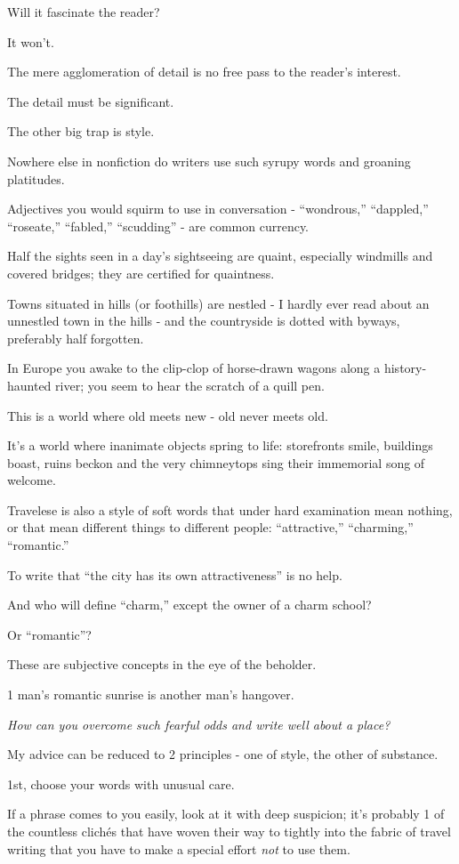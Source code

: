 \documentclass{book}
\numberwithin{equation}{section}
\begin{document}
Will it fascinate the reader?

It won't.

The mere agglomeration of detail is no free pass to the reader's interest.

The detail must be significant.

The other big trap is style.

Nowhere else in nonfiction do writers use such syrupy words and groaning platitudes.

Adjectives you would squirm to use in conversation - ``wondrous,'' ``dappled,'' ``roseate,'' ``fabled,'' ``scudding'' - are common currency.

Half the sights seen in a day's sightseeing are quaint, especially windmills and covered bridges; they are certified for quaintness.

Towns situated in hills (or foothills) are nestled - I hardly ever read about an unnestled town in the hills - and the countryside is dotted with byways, preferably half forgotten.

In Europe you awake to the clip-clop of horse-drawn wagons along a history-haunted river; you seem to hear the scratch of a quill pen.

This is a world where old meets new - old never meets old.

It's a world where inanimate objects spring to life: storefronts smile, buildings boast, ruins beckon and the very chimneytops sing their immemorial song of welcome.

%
Travelese is also a style of soft words that under hard examination mean nothing, or that mean different things to different people: ``attractive,'' ``charming,'' ``romantic.''

To write that ``the city has its own attractiveness'' is no help.

And who will define ``charm,'' except the owner of a charm school?

Or ``romantic''?

These are subjective concepts in the eye of the beholder. 

1 man's romantic sunrise is another man's hangover.

%
\textit{How can you overcome such fearful odds and write well about a place?}

My advice can be reduced to 2 principles - one of style, the other of substance.

%
1st, choose your words with unusual care.

If a phrase comes to you easily, look at it with deep suspicion; it's probably 1 of the countless clich\'es that have woven their way to tightly into the fabric of travel writing that you have to make a special effort \textit{not} to use them.
\end{document}
